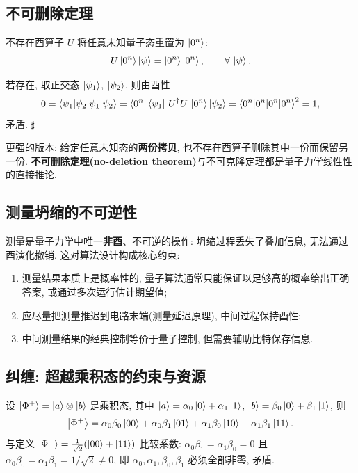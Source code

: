 \documentclass[utf8]{article} %
\numberwithin{equation}{section}   %
\newtheorem{Thm}{\hskip 2em {\color{blue} 定理}}[subsection]
\newtheorem{Note}{\hskip 2em {\color{red} 注}}[subsection]
\newtheorem{Eg}{\hskip 2em {\color{black} 例}}[subsection]
\newenvironment{Proof}{{\noindent\it Proof:}\quad}{\hfill $\sharp $\par}
\begin{document}
\subsection{不可删除定理}

\begin{Thm}[不可删除定理]
    不存在酉算子 $U$ 将任意未知量子态重置为 $\ket{0^n}$:
    \begin{equation}
        U \ket{0^n}\ket{\psi} = \ket{0^n}\ket{0^n}, \qquad \forall\, \ket{\psi}.
    \end{equation}
\end{Thm}

\begin{Proof}
    若存在, 取正交态 $\ket{\psi_1}$, $\ket{\psi_2}$, 则由酉性
    \[ 0 = \braket{\psi_1|\psi_2} = \bra{0^n}\bra{\psi_1}\, U^\dagger U\, \ket{0^n}\ket{\psi_2}
       = \braket{0^n|0^n}^2 = 1, \]
    矛盾.
\end{Proof}

\begin{Note}
    更强的版本: 给定任意未知态的\textbf{两份拷贝}, 也不存在酉算子删除其中一份而保留另一份.
    \textbf{不可删除定理(no-deletion theorem)}与不可克隆定理都是量子力学线性性的直接推论.
\end{Note}

\subsection{测量坍缩的不可逆性}

\begin{Note}
    测量是量子力学中唯一\textbf{非酉}、不可逆的操作: 坍缩过程丢失了叠加信息,
    无法通过酉演化撤销. 这对算法设计构成核心约束:
    \begin{enumerate}
        \item 测量结果本质上是概率性的, 量子算法通常只能保证以足够高的概率给出正确答案,
        或通过多次运行估计期望值;
        \item 应尽量把测量推迟到电路末端(测量延迟原理), 中间过程保持酉性;
        \item 中间测量结果的经典控制等价于量子控制, 但需要辅助比特保存信息.
    \end{enumerate}
\end{Note}

\subsection{纠缠: 超越乘积态的约束与资源}

\begin{Eg}
    设 $\ket{\Phi^+} = \ket{a}\otimes\ket{b}$ 是乘积态, 其中
    $\ket{a} = \alpha_0\ket{0} + \alpha_1\ket{1}$, $\ket{b} = \beta_0\ket{0} + \beta_1\ket{1}$, 则
    \[ \ket{\Phi^+} = \alpha_0\beta_0\ket{00} + \alpha_0\beta_1\ket{01} + \alpha_1\beta_0\ket{10} + \alpha_1\beta_1\ket{11}. \]
    与定义 $\ket{\Phi^+} = \frac{1}{\sqrt{2}}(\ket{00} + \ket{11})$ 比较系数:
    $\alpha_0\beta_1 = \alpha_1\beta_0 = 0$ 且 $\alpha_0\beta_0 = \alpha_1\beta_1 = 1/\sqrt{2} \neq 0$,
    即 $\alpha_0, \alpha_1, \beta_0, \beta_1$ 必须全部非零, 矛盾.
\end{Eg}
\end{document}
